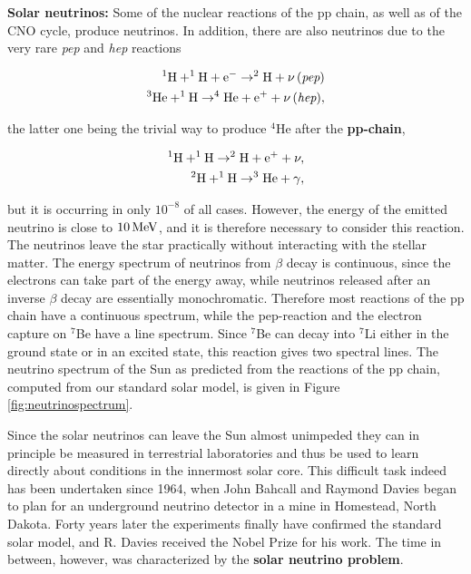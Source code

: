 \documentclass[a4paper,10pt]{article}
\begin{document}
{\noindent}\textbf{Solar neutrinos:} Some of the nuclear reactions of the pp chain, as well as of the CNO cycle, produce neutrinos. In addition, there are also neutrinos due to the very rare \textit{pep} and \textit{hep} reactions

\begin{align*}
    {\rm ^1H+^1H+e^- \rightarrow ^2H+\nu\,(\textit{pep})} \\
    {\rm ^3He+^1H \rightarrow ^4He+e^++\nu\,(\textit{hep})},
\end{align*}

{\noindent}the latter one being the trivial way to produce $^4$He after the \textbf{pp-chain},

\begin{align*}
    {\rm ^1H+^1H \rightarrow ^2H+e^++\nu,} \\
    {\rm ^2H+^1H \rightarrow ^3He+\gamma},
\end{align*}

but it is occurring in only $10^{-8}$ of all cases. However, the energy of the emitted neutrino is close to $10\,{\rm MeV}$, and it is therefore necessary to consider this reaction. The neutrinos leave the star practically without interacting with the stellar matter. The energy spectrum of neutrinos from $\beta$ decay is continuous, since the electrons can take part of the energy away, while neutrinos released after an inverse $\beta$ decay are essentially monochromatic. Therefore most reactions of the pp chain have a continuous spectrum, while the pep-reaction and the electron capture on $^7$Be have a line spectrum. Since $^7$Be can decay into $^7$Li either in the ground state or in an excited state, this reaction gives two spectral lines. The neutrino spectrum of the Sun as predicted from the reactions of the pp chain, computed from our standard solar model, is given in Figure \ref{fig:neutrinospectrum}.

{\noindent}Since the solar neutrinos can leave the Sun almost unimpeded they can in principle be measured in terrestrial laboratories and thus be used to learn directly about conditions in the innermost solar core. This difficult task indeed has been undertaken since 1964, when John Bahcall and Raymond Davies began to plan for an underground neutrino detector in a mine in Homestead, North Dakota. Forty years later the experiments finally have confirmed the standard solar model, and R. Davies received the Nobel Prize for his work. The time in between, however, was characterized by the \textbf{solar neutrino problem}.
\end{document}
